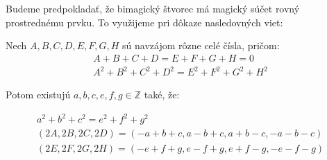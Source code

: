 

Budeme predpokladať, že bimagický štvorec má magický súčet rovný prostrednému prvku. To využijeme pri dôkaze nasledovných viet:

\begin{theorem}
\label{5x5bimagic2}
Nech $A, B, C, D, E, F, G, H$ sú navzájom rôzne celé čísla, pričom:
\begin{gather*}
A + B + C + D = E + F + G + H = 0 \\
A^2 + B^2 + C^2 + D^2 = E^2 + F^2 + G^2 + H^2
\end{gather*}

Potom existujú $a,b,c,e,f,g \in \mathbb{Z}$ také, že:

\begin{gather*}
a^2 + b^2 + c^2 = e^2 + f^2 + g^2 \\
(2A,2B,2C,2D) = (-a+b+c, a-b+c,a+b-c, -a-b-c) \\
(2E,2F,2G,2H) = (-e+f+g, e-f+g, e+f-g, -e-f-g)
\end{gather*}

\end{theorem}

